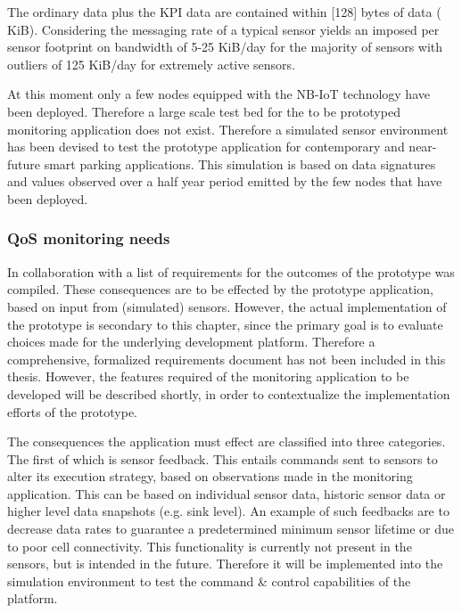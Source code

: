 The ordinary data plus the \ublox KPI data are contained within [128] bytes of data ( KiB). Considering the messaging rate of a typical sensor yields an imposed per sensor footprint on bandwidth of 5-25 KiB/day for the majority of sensors with outliers of 125 KiB/day for extremely active sensors.

At this moment only a few nodes equipped with the NB-IoT technology have been deployed. Therefore a large scale test bed for the to be prototyped monitoring application does not exist. Therefore a simulated sensor environment has been devised to test the prototype application for contemporary and near-future smart parking applications. This simulation is based on data signatures and values observed over a half year period emitted by the few nodes that have been deployed.

\subsubsection{QoS monitoring needs}
In collaboration with \idsystems a list of requirements for the outcomes of the prototype was compiled. These consequences are to be effected by the prototype application, based on input from (simulated) sensors. However, the actual implementation of the prototype is secondary to this chapter, since the primary goal is to evaluate choices made for the underlying development platform. Therefore a comprehensive, formalized requirements document has not been included in this thesis. However, the features required of the monitoring application to be developed will be described shortly, in order to contextualize the implementation efforts of the prototype.

The consequences the application must effect are classified into three categories. The first of which is sensor feedback. This entails commands sent to sensors to alter its execution strategy, based on observations made in the monitoring application. This can be based on individual sensor data, historic sensor data or higher level data snapshots (e.g. sink level). An example of such feedbacks are to decrease data rates to guarantee a predetermined minimum sensor lifetime or due to poor cell connectivity. This functionality is currently not present in the \nedap sensors, but is intended in the future. Therefore it will be implemented into the simulation environment to test the command \& control capabilities of the platform.

